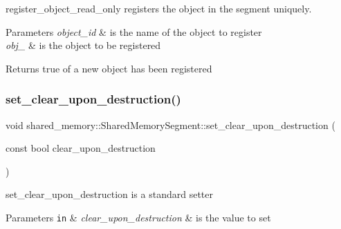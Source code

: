 register\+\_\+object\+\_\+read\+\_\+only registers the object in the segment uniquely. 


\begin{DoxyParams}{Parameters}
{\em object\+\_\+id} & is the name of the object to register \\
\hline
{\em obj\+\_\+} & is the object to be registered \\
\hline
\end{DoxyParams}
\begin{DoxyReturn}{Returns}
true of a new object has been registered 
\end{DoxyReturn}
\mbox{\label{classshared__memory_1_1SharedMemorySegment_ae2eb51704f44076db6ce79054e9d2572}} 
\subsubsection{\texorpdfstring{set\+\_\+clear\+\_\+upon\+\_\+destruction()}{set\_clear\_upon\_destruction()}}
{\footnotesize\ttfamily void shared\+\_\+memory\+::\+Shared\+Memory\+Segment\+::set\+\_\+clear\+\_\+upon\+\_\+destruction (\begin{DoxyParamCaption}\item[{const bool}]{clear\+\_\+upon\+\_\+destruction }\end{DoxyParamCaption})\hspace{0.3cm}{\ttfamily [inline]}}



set\+\_\+clear\+\_\+upon\+\_\+destruction is a standard setter 


\begin{DoxyParams}[1]{Parameters}
\mbox{\tt in}  & {\em clear\+\_\+upon\+\_\+destruction} & is the value to set \\
\hline
\end{DoxyParams}
\mbox{\label{classshared__memory_1_1SharedMemorySegment_a16e6213d7dd1984799bbd8fbe14225dc}} 
